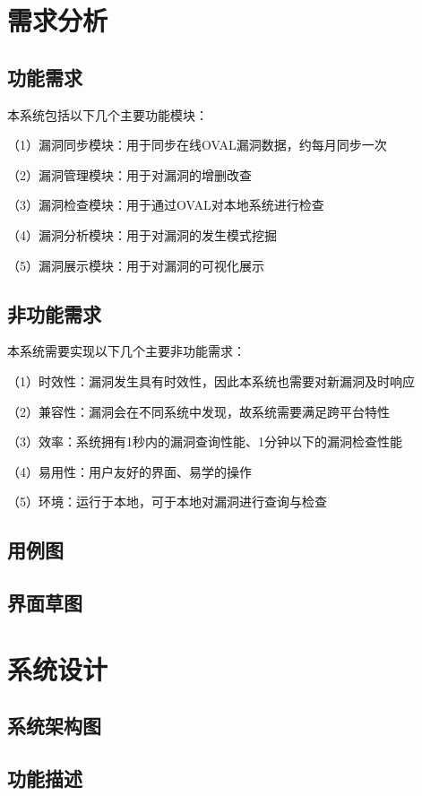 \documentclass[a4paper]{ctexrep}
\begin{document}
		\section{需求分析}
			\subsection{功能需求}
			本系统包括以下几个主要功能模块：

			（1）漏洞同步模块：用于同步在线OVAL漏洞数据，约每月同步一次

			（2）漏洞管理模块：用于对漏洞的增删改查

			（3）漏洞检查模块：用于通过OVAL对本地系统进行检查

			（4）漏洞分析模块：用于对漏洞的发生模式挖掘

			（5）漏洞展示模块：用于对漏洞的可视化展示

			\subsection{非功能需求}
			本系统需要实现以下几个主要非功能需求：

			（1）时效性：漏洞发生具有时效性，因此本系统也需要对新漏洞及时响应

			（2）兼容性：漏洞会在不同系统中发现，故系统需要满足跨平台特性

			（3）效率：系统拥有1秒内的漏洞查询性能、1分钟以下的漏洞检查性能

			（4）易用性：用户友好的界面、易学的操作

			（5）环境：运行于本地，可于本地对漏洞进行查询与检查

			\subsection{用例图}

			\subsection{界面草图}

		\section{系统设计}
			\subsection{系统架构图}
			\subsection{功能描述}
\end{document}
